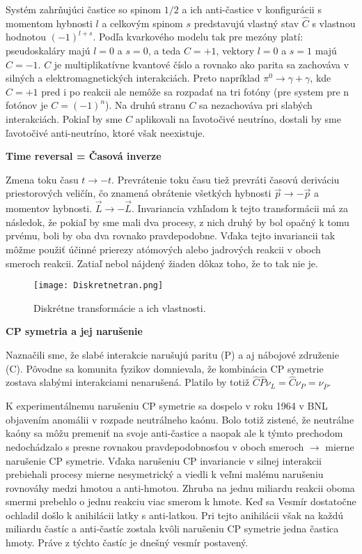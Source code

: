 \documentclass[../../main.tex]{subfiles}
\begin{document}
Systém zahrňujúci častice so spinom $1/2$ a ich anti-častice v konfigurácii s momentom hybnosti $l$ a celkovým spinom $s$ predstavujú vlastný stav $\hat{C}$ s vlastnou hodnotou $(-1)^{l+s}$. Podľa kvarkového modelu tak pre mezóny platí: pseudoskaláry majú $l=0$ a $s=0$, a teda $C=+1$, vektory $l=0$ a $s=1$ majú $C=-1$. $C$ je multiplikatívne kvantové číslo a rovnako ako parita sa zachováva v silných a elektromagnetických interakciách. Preto napríklad $\pi^0 \rightarrow \gamma + \gamma$, kde $C=+1$ pred i po reakcii ale nemôže sa rozpadať na tri fotóny (pre system pre n fotónov je $C=(-1)^n$). Na druhú stranu $C$ sa nezachováva pri slabých interakciách. Pokiaľ by sme $C$ aplikovali na ľavotočivé neutríno, dostali by sme ľavotočivé anti-neutríno, ktoré však neexistuje.\newline

\textbf{Time reversal = Časová inverze}\par
Zmena toku času $t\rightarrow -t$. Prevrátenie toku času tiež prevráti časovú deriváciu priestorových veličín, čo znamená obrátenie všetkých hybnosti $\vec{p} \rightarrow -\vec{p}$ a momentov hybnosti. $\vec{L} \rightarrow -\vec{L}$. Invariancia vzhľadom k tejto transformácii má za následok, že pokiaľ by sme mali dva procesy, z nich druhý by bol opačný k tomu prvému, boli by oba dva rovnako pravdepodobne. Vďaka tejto invariancii tak môžme použiť účinné prierezy atómových alebo jadrových reakcii v oboch smeroch reakcii. Zatiaľ nebol nájdený žiaden dôkaz toho, že to tak nie je. 
\begin{figure}[!h]
\centering
\texttt{[image: Diskretnetran.png]}
\caption{Diskrétne transformácie a ich vlastnosti.}
\label{sf1:fig:Diskretnetran}
\end{figure}
\newline
\textbf{CP symetria a jej narušenie}\par
Naznačili sme, že slabé interakcie narušujú paritu (P) a aj nábojové združenie (C). Pôvodne sa komunita fyzikov domnievala, že kombinácia CP symetrie zostava slabými interakciami nenarušená. Platilo by totiž $\hat{C}\hat{P}\nu_{L}=\hat{C}\nu_P=\nu_{\bar{P}}$.

K experimentálnemu narušeniu CP symetrie sa dospelo v roku 1964 v BNL objavením anomálii v rozpade neutrálneho kaónu. Bolo totiž zistené, že neutrálne kaóny sa môžu premeniť na svoje anti-častice a naopak ale k týmto prechodom nedochádzalo s presne rovnakou pravdepodobnosťou v oboch smeroch $\rightarrow$ mierne narušenie CP symetrie. Vďaka narušeniu CP invariancie v silnej interakcii prebiehali procesy mierne nesymetrický a viedli k veľmi malému narušeniu rovnováhy medzi hmotou a anti-hmotou. Zhruba na jednu miliardu reakcii oboma smermi prebehlo o jednu reakciu viac smerom k hmote. Keď sa Vesmír dostatočne ochladil došlo k anihilácii latky s anti-latkou. Pri tejto anihilácii však na každú miliardu častíc a anti-častíc zostala kvôli narušeniu CP symetrie jedna častica hmoty. Práve z týchto častíc je dnešný vesmír postavený.
\end{document}
